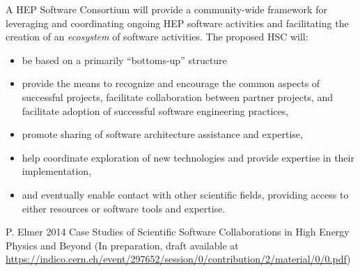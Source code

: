 \documentclass[12pt,letterpaper,fleqn]{article}
\begin{document}
A HEP Software Consortium will provide a community-wide framework
for leveraging and coordinating ongoing HEP software activities and facilitating the creation of an {\it ecosystem} of software activities.   The proposed HSC will:
\begin{itemize}
\item be based on a primarily ``bottoms-up'' structure
\item provide the means to recognize and encourage the common aspects
of successful projects, facilitate collaboration between partner
projects, and facilitate adoption of successful software engineering
practices,
\item promote sharing of software architecture assistance and expertise,
\item help coordinate exploration of new technologies and provide expertise in their implementation,
\item and eventually enable contact with other scientific fields,
providing access to either resources or software tools and expertise.
\end{itemize}



\newpage

\begin{thebibliography}{9}
 P. Elmer 2014 Case Studies of Scientific Software Collaborations in High Energy Physics and Beyond (In preparation, draft available at
\url{https://indico.cern.ch/event/297652/session/0/contribution/2/material/0/0.pdf})

\end{thebibliography}
\end{document}
